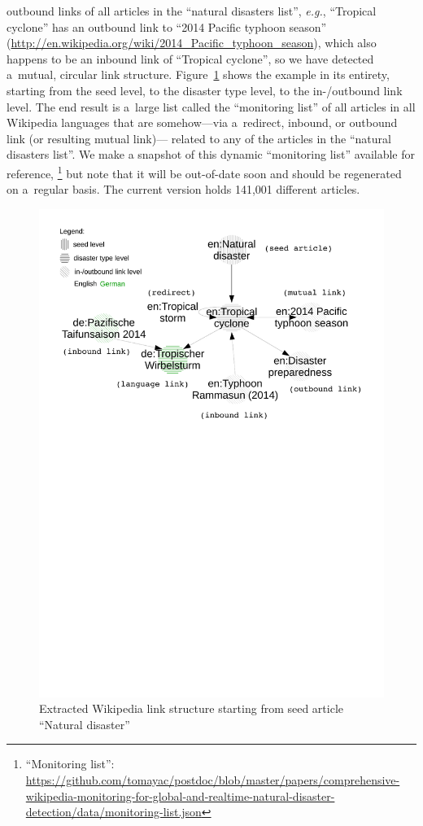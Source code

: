 \documentclass[letterpaper]{article}
\begin{document}
outbound links of all articles in the ``natural disasters list'',
\emph{e.g.}, ``Tropical cyclone'' has an outbound link to
``2014 Pacific typhoon season''
(\url{http://en.wikipedia.org/wiki/2014_Pacific_typhoon_season}),
which also happens to be an inbound link of ``Tropical cyclone'',
so we have detected a~mutual, circular link structure.
Figure~\ref{fig:link-structure} shows the example in its entirety,
starting from the seed level, to the disaster type level, to the in-/outbound link level.
The end result is a~large list called the ``monitoring list''
of all articles in all Wikipedia languages
that are somehow---via a~redirect, inbound, or outbound link (or resulting mutual link)---%
related to any of the articles
in the ``natural disasters list''.
We make a snapshot of this dynamic ``monitoring list'' available for reference,%
\footnote{``Monitoring list'':
\url{https://github.com/tomayac/postdoc/blob/master/papers/comprehensive-wikipedia-monitoring-for-global-and-realtime-natural-disaster-detection/data/monitoring-list.json}}
but note that it will be out-of-date soon and should be regenerated
on a~regular basis.
The current version holds 141,001 different articles.

\begin{figure}[hbt]
  \centering
  \includegraphics[trim=0mm 165mm 0mm 10mm,clip,width=0.875\linewidth]{link-structure}
  \caption{Extracted Wikipedia link structure starting from seed article ``Natural disaster''}
  \label{fig:link-structure}
\end{figure}
\end{document}
